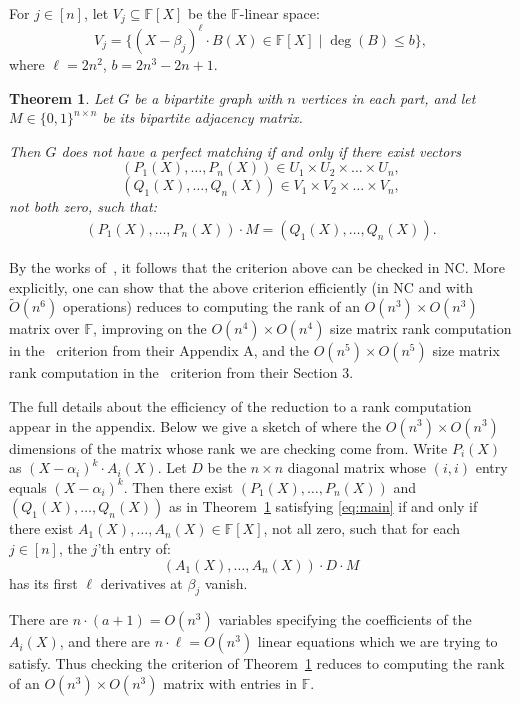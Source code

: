 \documentclass{article}
\newtheorem{theorem}{Theorem}[section]
\newcommand{\F}{\mathbb{F}}
\begin{document}
For $j \in [n]$, let $V_j \subseteq \F[X]$ be the $\F$-linear space:
$$ V_j = \{ (X-\beta_j)^{\ell} \cdot B(X) \in \F[X] \mid \deg(B) \leq b\},$$
where $ \ell = 2n^2$, $ b = 2n^3 - 2n + 1$.







\begin{theorem}\label{thm:main}
    Let $G$ be a bipartite graph with $n$ vertices in each part, and let $M \in \{0,1\}^{n \times n}$  be its bipartite adjacency matrix.

    Then $G$ does not have a perfect matching if and only if there exist vectors
    $$(P_1(X), \ldots, P_n(X)) \in U_1 \times U_2 \times \ldots \times U_n,$$
    $$(Q_1(X), \ldots, Q_n(X)) \in V_1 \times V_2 \times \ldots \times V_n,$$
    not both zero, such that:
    \begin{align}
    \label{eq:main}
        (P_1(X), \ldots, P_n(X)) \cdot M = (Q_1(X), \ldots, Q_n(X)).
    \end{align} 
\end{theorem}

By the works of~\cite{Csa76, IMR80, Ber84, Mulmuley87}, it follows that the criterion above can be checked in NC. More explicitly, one can show that the above criterion efficiently (in NC and with $\tilde O(n^6)$ operations) reduces to computing the rank of an $O(n^3) \times O(n^3)$ matrix over $\F$, improving on the $O(n^4) \times O(n^4)$ size matrix rank computation in the~\cite{CGGRT26} criterion from their Appendix A, and the $O(n^5) \times O(n^5)$ size matrix rank computation in the~\cite{CGGRT26} criterion from their Section 3.

The full details about the efficiency of the reduction to a rank computation appear in the appendix. Below we give a sketch of where the $O(n^3) \times O(n^3)$ dimensions of the matrix whose rank we are checking come from. 
Write $P_i(X)$ as $(X-\alpha_i)^k \cdot A_i(X)$.
Let $D$ be the $n \times n$ diagonal matrix whose $(i,i)$ entry equals $(X- \alpha_i)^k$.
Then there exist $(P_1(X), \ldots, P_n(X))$ and $(Q_1(X), \ldots, Q_n(X))$ 
as in Theorem~\ref{thm:main} satisfying \eqref{eq:main} if and only if
there exist $A_1(X), \ldots, A_n(X) \in \F[X]$, not all zero, such that for each $j \in [n]$,
the $j$'th entry of:
$$ (A_1(X), \ldots, A_n(X) ) \cdot D \cdot M$$
has its first $\ell$ derivatives at $\beta_j$ vanish.

There are $n \cdot (a+1) = O(n^3)$ variables specifying the coefficients of the $A_i(X)$, 
and there are $n \cdot \ell = O(n^3)$ linear equations which we are trying to satisfy. Thus checking the criterion of Theorem~\ref{thm:main} reduces to computing the rank of an $O(n^3) \times O(n^3)$ matrix with entries in $\F$.
\end{document}
